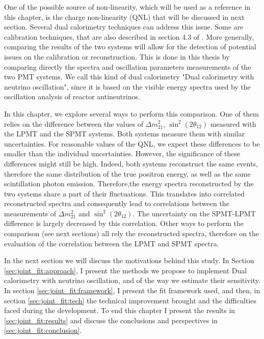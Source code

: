 \documentclass[../main.tex]{subfiles}
\begin{document}
One of the possible source of non-linearity, which will be used as a reference in this chapter, is the charge non-linearity (QNL) that will be discussed in next section.
Several dual calorimetry techniques can address this issue. Some are calibration techniques, that are also described in section 4.3 of \cite{han_dual_2021} .
More generally, comparing the results of the two systems will allow for the detection of potential issues on the calibration or reconstruction. This is done in this thesis by comparing directly the spectra and oscillation parameters measurements of the two PMT systems. We call this kind of dual calorimetry "Dual calorimetry with neutrino oscillation", since it is based on the visible energy spectra used by the oscillation analysis of reactor antineutrinos.

In this chapter, we explore several ways to perform this comparison. One of them relies on the difference between the values of $\Delta m^2_{21}$, $\sin^2(2\theta_{12})$ measured with the LPMT and the SPMT systems.
Both systems measure them with similar uncertainties. For reasonable values of the QNL, we expect these differences to be smaller than the individual uncertainties. However, the significance of these differences might still be high. Indeed, both systems reconstruct the same events, therefore the same distribution of the true positron energy, as well as the same scintillation photon emission. Therefore,the energy spectra reconstructed by the two systems share a part of their fluctuations. This translates into correlated reconstructed spectra and consequently lead to correlations between the measurements of $\Delta m^2_{21}$ and $\sin^2(2\theta_{12})$. The uncertainty on the SPMT-LPMT difference is largely decreased by this correlation.  Other ways to perform the comparison
(see next sections) all rely the reconstructed spectra, therefore on the evaluation of the correlation between the LPMT and SPMT spectra.

In the next section we will discuss the motivations behind this study. In Section \ref{sec:joint_fit:approach},  I present the methods we propose to implement Dual calorimetry with neutrino oscillation, and of the way we estimate their sensitivity. In section \ref{sec:joint_fit:framework}, I present the fit framework used, and then, in section \ref{sec:joint_fit:tech} the technical improvement brought and the difficulties faced during the development. To end this chapter I present the results in \ref{sec:joint_fit:results} and discuss the conclusions and perspectives in \ref{sec:joint_fit:conclusion}.
\end{document}
